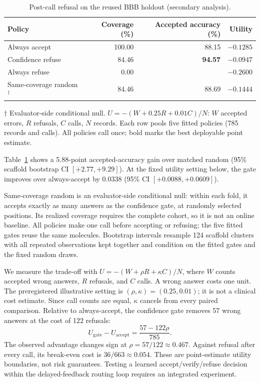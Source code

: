 \documentclass[sigconf,anonymous]{aamas}
\newcommand{\MiraTableFont}{\fontsize{9}{11}\selectfont}
\newcommand{\tnote}[1]{{\fontsize{8.5}{10}\selectfont\raggedright\par\vspace{3pt}#1\par}}
\newcommand{\notrun}{\textemdash}
\begin{document}
\begin{table}[t]
\caption{Post-call refusal on the reused BBB holdout (secondary analysis).}
\label{tab:postcall-verification}\label{tab:postcall}
\begingroup\centering\MiraTableFont\setlength{\tabcolsep}{14pt}\renewcommand{\arraystretch}{1.08}
\begin{tabular}{@{}lrrr@{}}
\toprule
Policy & Coverage (\%) & Accepted accuracy (\%) & Utility \\
\midrule
Always accept & 100.00 & 88.15 & $-0.1285$ \\
Confidence refuse & 84.46 & \textbf{94.57} & $\mathbf{-0.0947}$ \\
Always refuse & 0.00 & \notrun & $-0.2600$ \\
\midrule
Same-coverage random$^{\dagger}$ & 84.46 & 88.69 & $-0.1444$ \\
\bottomrule
\end{tabular}\par
\tnote{$\dagger$ Evaluator-side conditional null. $U=-(W+0.25R+0.01C)/N$: $W$ accepted errors, $R$ refusals, $C$ calls, $N$ records. Each row pools five fitted policies (785 records and calls). All policies call once; bold marks the best deployable point estimate.}
\endgroup
\end{table}

Table~\ref{tab:postcall} shows a 5.88-point accepted-accuracy gain over matched random (95\% scaffold bootstrap CI $[+2.77,+9.29]$). At the fixed utility setting below, the gate improves over always-accept by 0.0338 (95\% CI $[+0.0088,+0.0609]$).

Same-coverage random is an evaluator-side conditional null: within each fold, it accepts exactly as many answers as the confidence gate, at randomly selected positions. Its realized coverage requires the complete cohort, so it is not an online baseline. All policies make one call before accepting or refusing; the five fitted gates reuse the same molecules. Bootstrap intervals resample 124 scaffold clusters with all repeated observations kept together and condition on the fitted gates and the fixed random draws.

We measure the trade-off with $U=-(W+\rho R+\kappa C)/N$, where $W$ counts accepted wrong answers, $R$ refusals, and $C$ calls. A wrong answer costs one unit. The preregistered illustrative setting is $(\rho,\kappa)=(0.25,0.01)$; it is not a clinical cost estimate. Since call counts are equal, $\kappa$ cancels from every paired comparison. Relative to always-accept, the confidence gate removes 57 wrong answers at the cost of 122 refusals:
\begin{equation}
 U_{\mathrm{gate}}-U_{\mathrm{accept}}=\frac{57-122\rho}{785}.
\end{equation}
The observed advantage changes sign at $\rho=57/122\approx0.467$. Against refusal after every call, its break-even cost is $36/663\approx0.054$. These are point-estimate utility boundaries, not risk guarantees. Testing a learned accept/verify/refuse decision within the delayed-feedback routing loop requires an integrated experiment.
\end{document}
